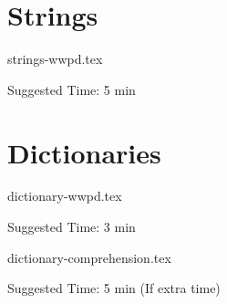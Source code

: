 \documentclass{exam}
\begin{document}
\section{Strings}
\begin{questions}
    {strings-wwpd.tex}
    \begin{questionmeta}
        Suggested Time: 5 min
    \end{questionmeta}
\end{questions}

\section{Dictionaries}
\begin{questions}
    {dictionary-wwpd.tex}
    \begin{questionmeta}
        Suggested Time: 3 min
    \end{questionmeta}

    {dictionary-comprehension.tex}
    \begin{questionmeta}
        Suggested Time: 5 min (If extra time)
    \end{questionmeta}
\end{questions}
\end{document}
